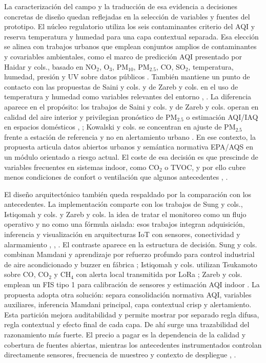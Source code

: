 La caracterización del campo y la traducción de esa evidencia a decisiones concretas de diseño quedan reflejadas en la selección de variables y fuentes del prototipo. El núcleo regulatorio utiliza los seis contaminantes criterio del AQI y reserva temperatura y humedad para una capa contextual separada. Esa elección se alinea con trabajos urbanos que emplean conjuntos amplios de contaminantes y covariables ambientales, como el marco de predicción AQI presentado por Haidar y cols., basado en NO$_2$, O$_3$, PM$_{10}$, PM$_{2.5}$, CO, SO$_2$, temperatura, humedad, presión y UV sobre datos públicos \cite[pp.~3--4]{A028}. También mantiene un punto de contacto con las propuestas de Saini y cols. y de Zareb y cols. en el uso de temperatura y humedad como variables relevantes del entorno \cite[pp.~3--5]{A135}, \cite[pp.~2--3,~5]{A167}. La diferencia aparece en el propósito: los trabajos de Saini y cols. y de Zareb y cols. operan en calidad del aire interior y privilegian pronóstico de PM$_{2.5}$ o estimación AQI/IAQ en espacios domésticos \cite[pp.~1,~3--5]{A135}, \cite[pp.~1,~3--5]{A167}; Kowalski y cols. se concentran en ajuste de PM$_{2.5}$ frente a estación de referencia y no en alertamiento urbano \cite[pp.~5--6]{A084}. En ese contexto, la propuesta articula datos abiertos urbanos y semántica normativa EPA/AQS en un módulo orientado a riesgo actual. El coste de esa decisión es que prescinde de variables frecuentes en sistemas indoor, como CO$_2$ o TVOC, y por ello cubre menos condiciones de confort o ventilación que algunos antecedentes \cite[pp.~3--5]{A135}, \cite[p.~1]{A165}.

El diseño arquitectónico también queda respaldado por la comparación con los antecedentes. La implementación comparte con los trabajos de Sung y cols., Istiqomah y cols. y Zareb y cols. la idea de tratar el monitoreo como un flujo operativo y no como una fórmula aislada: esos trabajos integran adquisición, inferencia y visualización en arquitecturas IoT con sensores, conectividad y alarmamiento \cite[pp.~7,~11--15,~24]{A114}, \cite[pp.~1--2,~5--6]{A165}, \cite[pp.~2--3,~5]{A167}. El contraste aparece en la estructura de decisión. Sung y cols. combinan Mamdani y aprendizaje por refuerzo profundo para control industrial de aire acondicionado y buzzer en fábrica \cite[pp.~1,~7--10,~16--23]{A114}; Istiqomah y cols. utilizan Tsukamoto sobre CO, CO$_2$ y CH$_4$ con alerta local transmitida por LoRa \cite[pp.~2--6]{A165}; Zareb y cols. emplean un FIS tipo 1 para calibración de sensores y estimación AQI indoor \cite[pp.~1,~3--5]{A167}. La propuesta adopta otra solución: separa consolidación normativa AQI, variables auxiliares, inferencia Mamdani principal, capa contextual crisp y alertamiento. Esta partición mejora auditabilidad y permite mostrar por separado regla difusa, regla contextual y efecto final de cada capa. De ahí surge una trazabilidad del razonamiento más fuerte. El precio a pagar es la dependencia de la calidad y cobertura de fuentes abiertas, mientras los antecedentes instrumentados controlan directamente sensores, frecuencia de muestreo y contexto de despliegue \cite[pp.~3--4]{A028}, \cite[pp.~1--2,~5]{A167}.

